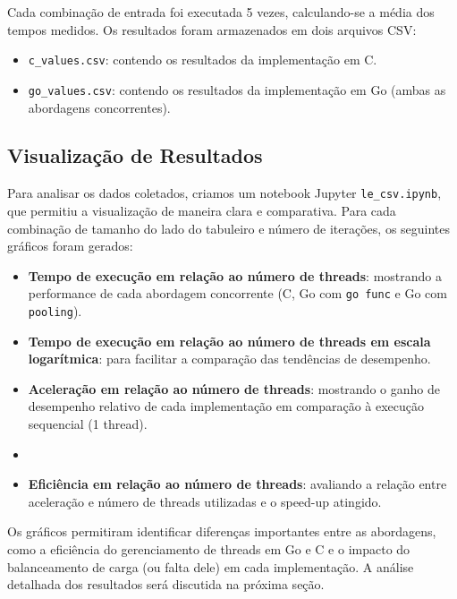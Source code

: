 \documentclass[14]{article}
\begin{document}
Cada combinação de entrada foi executada 5 vezes, calculando-se a média dos tempos medidos. Os resultados foram armazenados em dois arquivos CSV:
\begin{itemize}
    \item \texttt{c\_values.csv}: contendo os resultados da implementação em C.
    \item \texttt{go\_values.csv}: contendo os resultados da implementação em Go (ambas as abordagens concorrentes).
\end{itemize}

\subsection{Visualização de Resultados}

Para analisar os dados coletados, criamos um notebook Jupyter \texttt{le\_csv.ipynb}, que permitiu a visualização de maneira clara e comparativa. Para cada combinação de tamanho do lado do tabuleiro e número de iterações, os seguintes gráficos foram gerados:

\begin{itemize}
    \item \textbf{Tempo de execução em relação ao número de threads}: mostrando a performance de cada abordagem concorrente (C, Go com \texttt{go func} e Go com \texttt{pooling}).
    \item \textbf{Tempo de execução em relação ao número de threads em escala logarítmica}: para facilitar a comparação das tendências de desempenho.
    \item \textbf{Aceleração em relação ao número de threads}: mostrando o ganho de desempenho relativo de cada implementação em comparação à execução sequencial (1 thread).
    \item \item \textbf{Eficiência em relação ao número de threads}: avaliando a relação entre aceleração e número de threads utilizadas e o speed-up atingido.
\end{itemize}

Os gráficos permitiram identificar diferenças importantes entre as abordagens, como a eficiência do gerenciamento de threads em Go e C e o impacto do balanceamento de carga (ou falta dele) em cada implementação. A análise detalhada dos resultados será discutida na próxima seção.
\end{document}
